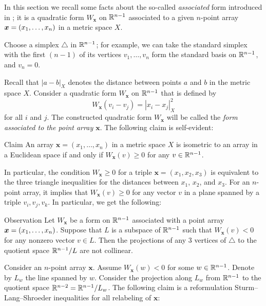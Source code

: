 \documentclass{article}
\begin{document}
In this section we recall some facts about the so-called \emph{associated} form introduced in \cite{petrunin-2017};
it is a quadratic form 
$W_{\bm{x}}$ on $\mathbb{R}^{n-1}$ associated
to a given $n$-point array $\bm{x}\z=(x_1,\dots,x_n)$ in a metric space $X$.

Choose a simplex $\triangle$ in $\mathbb{R}^{n-1}$; for example, we can take the standard simplex with the first $(n-1)$ of its vertices $v_1,\dots,v_n$ form the standard basis on $\mathbb{R}^{n-1}$,
 and $v_n=0$.

Recall that $|a-b|_X$ denotes the distance between points $a$ and $b$ in the metric space $X$.
Consider a quadratic form $W_{\bm{x}}$ on $\mathbb{R}^{n-1}$ that is defined by
\[W_{\bm{x}}(v_i-v_j)=|x_i-x_j|^2_X\] 
for all $i$ and $j$.
The constructed quadratic form $W_{\bm{x}}$ will be called
the \emph{form associated to the point array $\bm{x}$}.
The following claim is self-evident:

\begin{thm}{Claim}\label{clm:W>=0}
An array $\bm{x}=(x_1,\dots,x_n)$ in a metric space $X$ is isometric to an array in a Euclidean space if and only if 
$W_{\bm{x}}(v)\ge 0$
for any $v\in \mathbb{R}^{n-1}$.
\end{thm}


In particular, the condition $W_{\bm{x}}\ge 0$ for a triple $\bm{x}=(x_1,x_2,x_3)$ is equivalent to 
the three triangle inequalities for the distances between $x_1$, $x_2$, and $x_3$.
For an $n$-point array, it implies that $W_{\bm{x}}(v)\ge 0$ for any vector $v$ in a plane spanned by a triple $v_i,v_j,v_k$.
In particular, we get the following:

\begin{thm}{Observation}\label{triangle-inq}
Let $W_{\bm{x}}$ be a form on $\mathbb{R}^{n-1}$ associated with a point array $\bm{x}\z=(x_1,\dots,x_n)$.
Suppose that $L$ is a subspace of $\mathbb{R}^{n-1}$ such that
$W_{\bm{x}}(v)< 0$ for any nonzero vector $v\in L$.
Then the projections of any 3 vertices of $\triangle$ to the quotient space $\mathbb{R}^{n-1}/L$ are not collinear.
\end{thm}

Consider an $n$-point array $\bm{x}$.
Assume $W_{\bm{x}}(w)<0$ for some $w\in\mathbb{R}^{n-1}$.
Denote by $L_w$ the line spanned by $w$.
Consider the projection along $L_w$ from $\mathbb{R}^{n-1}$ to the quotient space $\RR^{n-2}\z=\RR^{n-1}/L_w$.
The following claim is a reformulation Sturm--Lang--Shroeder inequalities for all relabeling of $\bm{x}$:
\end{document}
